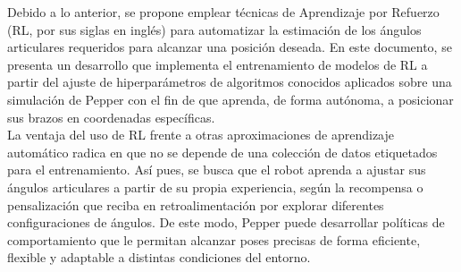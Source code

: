 Debido a lo anterior, se propone emplear técnicas de Aprendizaje por Refuerzo (RL, por sus siglas en inglés) para automatizar la estimación de los ángulos articulares requeridos para alcanzar una posición deseada. En este documento, se presenta un desarrollo que implementa el entrenamiento de modelos de RL a partir del ajuste de hiperparámetros de algoritmos conocidos aplicados sobre una simulación de Pepper con el fin de que aprenda, de forma autónoma, a posicionar sus brazos en coordenadas específicas.\\

La ventaja del uso de RL frente a otras aproximaciones de aprendizaje automático radica en que no se depende de una colección de datos etiquetados para el entrenamiento. Así pues, se busca que el robot aprenda a ajustar sus ángulos articulares a partir de su propia experiencia, según la recompensa o pensalización que reciba en retroalimentación por explorar diferentes configuraciones de ángulos. De este modo, Pepper puede desarrollar políticas de comportamiento que le permitan alcanzar poses precisas de forma eficiente, flexible y adaptable a distintas condiciones del entorno.\\